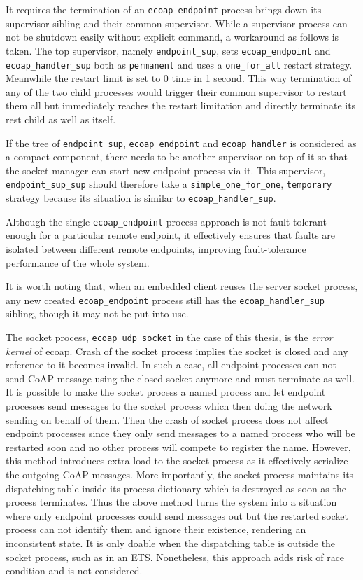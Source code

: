 It requires the termination of an \verb|ecoap_endpoint| process brings down its supervisor sibling and their common supervisor. While a supervisor process can not be shutdown easily without explicit command, a workaround as follows is taken. The top supervisor, namely \verb|endpoint_sup|, sets \verb|ecoap_endpoint| and \verb|ecoap_handler_sup| both as \verb|permanent| and uses a \verb|one_for_all| restart strategy. Meanwhile the restart limit is set to 0 time in 1 second. This way termination of any of the two child processes would trigger their common supervisor to restart them all but immediately reaches the restart limitation and directly terminate its rest child as well as itself. 

If the tree of \verb|endpoint_sup|, \verb|ecoap_endpoint| and \verb|ecoap_handler| is considered as a compact component, there needs to be another supervisor on top of it so that the socket manager can start new endpoint process via it. This supervisor, \verb|endpoint_sup_sup| should therefore take a \verb|simple_one_for_one|, \verb|temporary| strategy because its situation is similar to \verb|ecoap_handler_sup|. 

Although the single \verb|ecoap_endpoint| process approach is not fault-tolerant enough for a particular remote endpoint, it effectively ensures that faults are isolated between different remote endpoints, improving fault-tolerance performance of the whole system. 

It is worth noting that, when an embedded client reuses the server socket process, any new created \verb|ecoap_endpoint| process still has the \verb|ecoap_handler_sup| sibling, though it may not be put into use. 

The socket process, \verb|ecoap_udp_socket| in the case of this thesis, is the \textit{error kernel} of ecoap. Crash of the socket process implies the socket is closed and any reference to it becomes invalid. In such a case, all endpoint processes can not send CoAP message using the closed socket anymore and must terminate as well. It is possible to make the socket process a named process and let endpoint processes send messages to the socket process which then doing the network sending on behalf of them. Then the crash of socket process does not affect endpoint processes since they only send messages to a named process who will be restarted soon and no other process will compete to register the name. However, this method introduces extra load to the socket process as it effectively serialize the outgoing CoAP messages. More importantly, the socket process maintains its dispatching table inside its process dictionary which is destroyed as soon as the process terminates. Thus the above method turns the system into a situation where only endpoint processes could send messages out but the restarted socket process can not identify them and ignore their existence, rendering an inconsistent state. It is only doable when the dispatching table is outside the socket process, such as in an ETS. Nonetheless, this approach adds risk of race condition and is not considered. 

